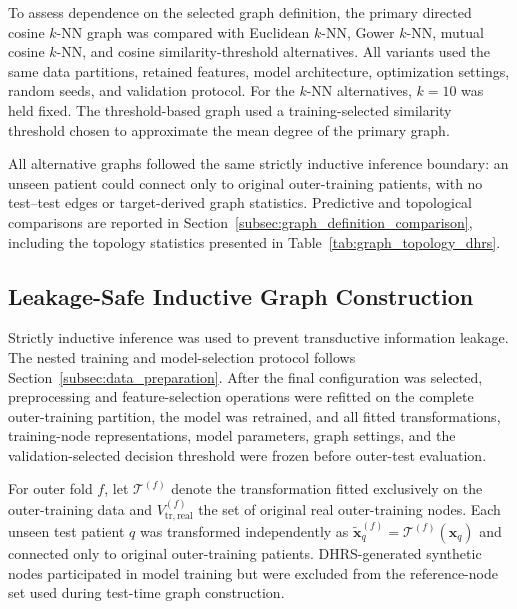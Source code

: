 \documentclass[pdflatex,sn-mathphys-num]{sn-jnl}%
\theoremstyle{thmstyleone}%
\theoremstyle{thmstyletwo}%
\theoremstyle{thmstylethree}%
\begin{document}
 {
To assess dependence on the selected graph definition, the primary directed
cosine \(k\)-NN graph was compared with Euclidean \(k\)-NN, Gower \(k\)-NN,
mutual cosine \(k\)-NN, and cosine similarity-threshold alternatives. All
variants used the same data partitions, retained features, model architecture,
optimization settings, random seeds, and validation protocol. For the
\(k\)-NN alternatives, \(k=10\) was held fixed. The threshold-based graph used
a training-selected similarity threshold chosen to approximate the mean
degree of the primary graph.
}

 {
All alternative graphs followed the same strictly inductive inference
boundary: an unseen patient could connect only to original outer-training
patients, with no test--test edges or target-derived graph statistics.
Predictive and topological comparisons are reported in
Section~\ref{subsec:graph_definition_comparison}, including the topology
statistics presented in Table~\ref{tab:graph_topology_dhrs}.}
\subsection{Leakage-Safe Inductive Graph Construction}
\label{subsec:inductive_graph_construction}

 {
Strictly inductive inference was used to prevent transductive information
leakage. The nested training and model-selection protocol follows
Section~\ref{subsec:data_preparation}. After the final configuration was
selected, preprocessing and feature-selection operations were refitted on the
complete outer-training partition, the model was retrained, and all fitted
transformations, training-node representations, model parameters, graph
settings, and the validation-selected decision threshold were frozen before
outer-test evaluation.
}

 {
For outer fold \(f\), let \(\mathcal{T}^{(f)}\) denote the transformation
fitted exclusively on the outer-training data and
\(V_{\mathrm{tr,real}}^{(f)}\) the set of original real outer-training nodes.
Each unseen test patient \(q\) was transformed independently as
\(\widetilde{\mathbf{x}}_{q}^{(f)}
=\mathcal{T}^{(f)}(\mathbf{x}_{q})\) and connected only to original
outer-training patients. DHRS-generated synthetic nodes participated in model
training but were excluded from the reference-node set used during test-time
graph construction.
}
\end{document}
